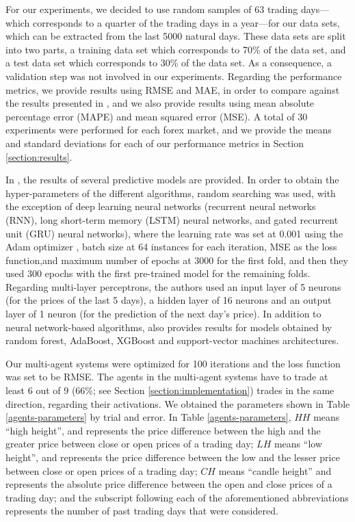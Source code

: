 \documentclass{ieeeaccess}
\begin{document}
For our experiments, we decided to use random samples of 63 trading
days---which corresponds to a quarter of the trading days in a
year---for our data sets, which can be extracted from the last 5000
natural days. These data sets are split into two parts, a
training data set which corresponds to 70\% of the data set, and a
test data set which corresponds to 30\% of the data set. As a
consequence, a validation step was not involved in our
experiments. Regarding the performance metrics, we provide results
using RMSE and MAE, in order to compare against the results presented
in \cite{Munkhdalai2019}, and we also provide results using mean
absolute percentage error (MAPE) and mean squared error (MSE). A total
of 30 experiments were performed for each forex market, and we provide
the means and standard deviations for each of our performance metrics
in Section \ref{section:results}.

In \cite{Munkhdalai2019}, the results of several predictive models are
provided. In order to obtain the hyper-parameters of the different
algorithms, random searching was used, with the exception of deep
learning neural networks (recurrent neural networks (RNN), long
short-term memory (LSTM) neural networks, and gated recurrent unit
(GRU) neural networks), where the learning rate was set at 0.001 using
the Adam optimizer \cite{kingma2014adam}, batch size at 64 instances
for each iteration, MSE as the loss function,and maximum number of
epochs at 3000 for the first fold, and then they used 300 epochs with
the first pre-trained model for the remaining folds. Regarding
multi-layer perceptrons, the authors used an input layer of 5 neurons
(for the prices of the last 5 days), a hidden layer of 16 neurons and
an output layer of 1 neuron (for the prediction of the next day's
price). In addition to neural network-based algorithms,
\cite{kingma2014adam} also provides results for models obtained by
random forest, AdaBoost, XGBoost and support-vector machines
architectures.

Our multi-agent systems were optimized for 100 iterations and the loss
function was set to be RMSE. The agents in the multi-agent systems
have to trade at least 6 out of 9 (66\%; see Section
\ref{section:implementation}) trades in the same direction, regarding
their activations. We obtained the parameters shown in Table
\ref{agents-parameters} by trial and error. In Table
\ref{agents-parameters}, $HH$ means ``high height'', and represents
the price difference between the high and the greater price between
close or open prices of a trading day; $LH$ means ``low height'', and
represents the price difference between the low and the lesser price
between close or open prices of a trading day; $CH$ means ``candle
height'' and represents the absolute price difference between the open
and close prices of a trading day; and the subscript following each of
the aforementioned abbreviations represents the number of past trading
days that were considered.
\end{document}
